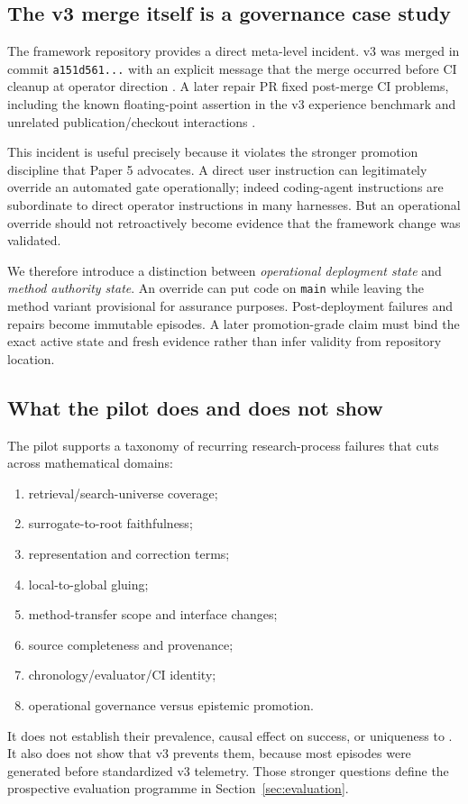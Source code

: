 \subsection{The v3 merge itself is a governance case study}

The framework repository provides a direct meta-level incident. \RAKL{} v3 was merged in commit \texttt{a151d561...} with an explicit message that the merge occurred before CI cleanup at operator direction \cite{rakl_v3_merge}. A later repair PR fixed post-merge CI problems, including the known floating-point assertion in the v3 experience benchmark and unrelated publication/checkout interactions \cite{rakl_pr120}.

This incident is useful precisely because it violates the stronger promotion discipline that Paper 5 advocates. A direct user instruction can legitimately override an automated gate operationally; indeed coding-agent instructions are subordinate to direct operator instructions in many harnesses. But an operational override should not retroactively become evidence that the framework change was validated.

We therefore introduce a distinction between \emph{operational deployment state} and \emph{method authority state}. An override can put code on \texttt{main} while leaving the method variant provisional for assurance purposes. Post-deployment failures and repairs become immutable episodes. A later promotion-grade claim must bind the exact active state and fresh evidence rather than infer validity from repository location.

\subsection{What the pilot does and does not show}

The pilot supports a taxonomy of recurring research-process failures that cuts across mathematical domains:

\begin{enumerate}[leftmargin=*]
\item retrieval/search-universe coverage;
\item surrogate-to-root faithfulness;
\item representation and correction terms;
\item local-to-global gluing;
\item method-transfer scope and interface changes;
\item source completeness and provenance;
\item chronology/evaluator/CI identity;
\item operational governance versus epistemic promotion.
\end{enumerate}

It does not establish their prevalence, causal effect on success, or uniqueness to \RAKL{}. It also does not show that v3 prevents them, because most episodes were generated before standardized v3 telemetry. Those stronger questions define the prospective evaluation programme in Section~\ref{sec:evaluation}.